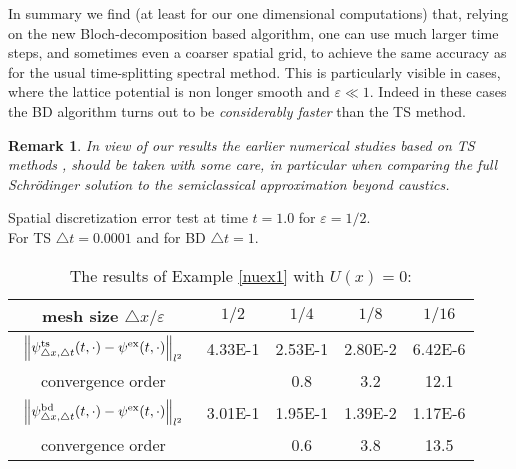 \documentclass[leqno,final]{siamltex}
\newtheorem{remark}{Remark}[section]
\numberwithin{equation}{section}
\newcounter{me}
\begin{document}
In summary we find (at least for our one dimensional computations)
that, relying on the new Bloch-decomposition based algorithm, one
can use much larger time steps, and sometimes even a coarser
spatial grid, to achieve the same accuracy as for the usual
time-splitting spectral method. This is particularly visible in
cases, where the lattice potential is non longer smooth and ${{\varepsilon }}\ll
1$. Indeed in these cases the BD algorithm turns out to be
\emph{considerably faster} than the TS method.
\begin{remark}
In view of our results the earlier numerical studies based on TS
methods \cite{GoMa, Go, GoMau}, should be taken with some care, in
particular when comparing the full Schr\"odinger solution to the
semiclassical approximation beyond caustics.
\end{remark}
\begin{table}[htbp]
\caption{The results of Example \ref{nuex1} with
$U(x)=0$:}\label{tb1_0}
\begin{center}\footnotesize

{Spatial discretization error test at time $t=1.0$ for ${{\varepsilon }}=1/2$.\\
For TS ${\triangle} t=0.0001$ and for BD ${\triangle} t=1$. }
\begin{tabular}{c|cccc}\hline
mesh size ${\triangle} x/{{\varepsilon }}$& $1/2$ & $1/4$ & $1/8$ &   $1/16$ \\ \hline
$\begin{array}{c}\vspace*{-4mm} \\
\left\|\psi^{\rm ts}_{{\triangle} x,{\triangle} t}(t,\cdot)-\psi^{\rm
ex}(t,\cdot)\right\|_{l^2}\\ \vspace*{-4mm} \end{array}$
 &  4.33E-1 & 2.53E-1 &  2.80E-2 & 6.42E-6 \\ \hline
convergence order & & 0.8 & 3.2& 12.1 \\ \hline \hline
$\begin{array}{c}\vspace*{-4mm} \\
\left\|\psi^{\rm bd}_{{\triangle} x,{\triangle} t}(t,\cdot)-\psi^{\rm
ex}(t,\cdot)\right\|_{l^2}\\ \vspace*{-4mm} \end{array}$
 &  3.01E-1& 1.95E-1 &  1.39E-2 & 1.17E-6 \\ \hline
convergence order & & 0.6& 3.8& 13.5  \\ \hline 
\end{tabular}\vspace{5mm}


\end{center}
\end{table}
\end{document}

